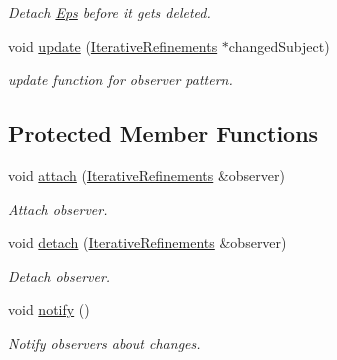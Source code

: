 \begin{DoxyCompactItemize}
\begin{DoxyCompactList}\small\item\em Detach \hyperlink{classSpacy_1_1Mixin_1_1Eps}{Eps} before it gets deleted. \end{DoxyCompactList}\item 
\hypertarget{classSpacy_1_1Mixin_1_1IterativeRefinements_adcb6062728331e48515a05f539628062}{}void \hyperlink{classSpacy_1_1Mixin_1_1IterativeRefinements_adcb6062728331e48515a05f539628062}{update} (\hyperlink{classSpacy_1_1Mixin_1_1IterativeRefinements}{Iterative\+Refinements} $\ast$changed\+Subject)\label{classSpacy_1_1Mixin_1_1IterativeRefinements_adcb6062728331e48515a05f539628062}

\begin{DoxyCompactList}\small\item\em update function for observer pattern. \end{DoxyCompactList}\end{DoxyCompactItemize}
\subsection*{Protected Member Functions}
\begin{DoxyCompactItemize}
\item 
\hypertarget{classSpacy_1_1Mixin_1_1MixinConnection_abb5520ee6b22dd993d78f142939a1ed4}{}void \hyperlink{classSpacy_1_1Mixin_1_1MixinConnection_abb5520ee6b22dd993d78f142939a1ed4}{attach} (\hyperlink{classSpacy_1_1Mixin_1_1IterativeRefinements}{Iterative\+Refinements} \&observer)\label{classSpacy_1_1Mixin_1_1MixinConnection_abb5520ee6b22dd993d78f142939a1ed4}

\begin{DoxyCompactList}\small\item\em Attach observer. \end{DoxyCompactList}\item 
\hypertarget{classSpacy_1_1Mixin_1_1MixinConnection_adda739590c487679c26f60e50aedb73f}{}void \hyperlink{classSpacy_1_1Mixin_1_1MixinConnection_adda739590c487679c26f60e50aedb73f}{detach} (\hyperlink{classSpacy_1_1Mixin_1_1IterativeRefinements}{Iterative\+Refinements} \&observer)\label{classSpacy_1_1Mixin_1_1MixinConnection_adda739590c487679c26f60e50aedb73f}

\begin{DoxyCompactList}\small\item\em Detach observer. \end{DoxyCompactList}\item 
\hypertarget{classSpacy_1_1Mixin_1_1MixinConnection_a1ddeaa78a3bb4a38c2cca36d1f99fe36}{}void \hyperlink{classSpacy_1_1Mixin_1_1MixinConnection_a1ddeaa78a3bb4a38c2cca36d1f99fe36}{notify} ()\label{classSpacy_1_1Mixin_1_1MixinConnection_a1ddeaa78a3bb4a38c2cca36d1f99fe36}

\begin{DoxyCompactList}\small\item\em Notify observers about changes. \end{DoxyCompactList}\end{DoxyCompactItemize}


